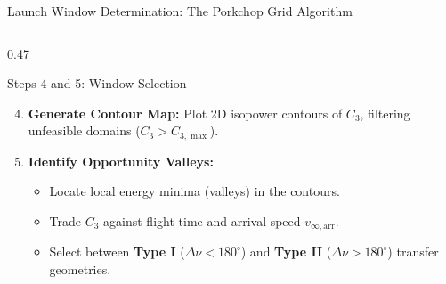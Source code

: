 \documentclass[aspectratio=169, 10pt]{beamer}
\begin{document}
\begin{frame}{Launch Window Determination: The Porkchop Grid Algorithm}
\begin{columns}[t]
        \begin{column}{0.47\textwidth}
            \begin{block}{Steps 4 and 5: Window Selection}
                \scriptsize
                \begin{enumerate}\setcounter{enumi}{3}\setlength{\itemsep}{1.2pt}\setlength{\topsep}{1pt}
                    \item \textbf{Generate Contour Map:} Plot 2D isopower contours of $C_3$, filtering unfeasible domains ($C_3 > C_{3,\max}$).
                    \item \textbf{Identify Opportunity Valleys:}
                    \begin{itemize}\setlength{\itemsep}{0.8pt}
                        \item Locate local energy minima (valleys) in the contours.
                        \item Trade $C_3$ against flight time and arrival speed $v_{\infty,\text{arr}}$.
                        \item Select between \textbf{Type I} ($\Delta\nu < 180^\circ$) and \textbf{Type II} ($\Delta\nu > 180^\circ$) transfer geometries.
                    \end{itemize}
                \end{enumerate}
            \end{block}
        \end{column}
    \end{columns}
\end{frame}
\end{document}
